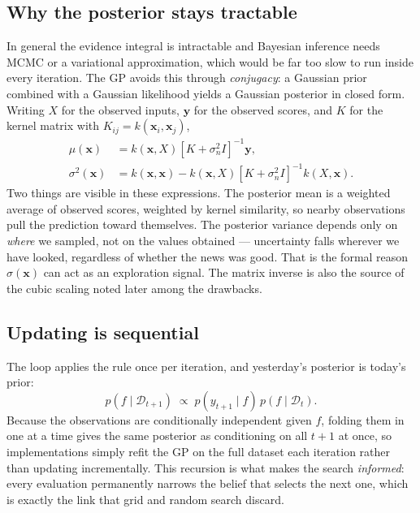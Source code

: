 \documentclass[conference]{IEEEtran}
\begin{document}
\subsection*{Why the posterior stays tractable}
In general the evidence integral is intractable and Bayesian inference needs MCMC or a variational approximation, which would be far too slow to run inside every iteration. The GP avoids this through \textit{conjugacy}: a Gaussian prior combined with a Gaussian likelihood yields a Gaussian posterior in closed form. Writing $X$ for the observed inputs, $\mathbf{y}$ for the observed scores, and $K$ for the kernel matrix with $K_{ij} = k(\mathbf{x}_i, \mathbf{x}_j)$,
\begin{align}
    \mu(\mathbf{x})      &= k(\mathbf{x}, X)\left[K + \sigma_n^2 I\right]^{-1}\mathbf{y}, \\
    \sigma^2(\mathbf{x}) &= k(\mathbf{x}, \mathbf{x}) - k(\mathbf{x}, X)\left[K + \sigma_n^2 I\right]^{-1}k(X, \mathbf{x}).
\end{align}
Two things are visible in these expressions. The posterior mean is a weighted average of observed scores, weighted by kernel similarity, so nearby observations pull the prediction toward themselves. The posterior variance depends only on \textit{where} we sampled, not on the values obtained --- uncertainty falls wherever we have looked, regardless of whether the news was good. That is the formal reason $\sigma(\mathbf{x})$ can act as an exploration signal. The matrix inverse is also the source of the cubic scaling noted later among the drawbacks.

\subsection*{Updating is sequential}
The loop applies the rule once per iteration, and yesterday's posterior is today's prior:
\begin{equation}
    p(f \mid \mathcal{D}_{t+1}) \;\propto\; p(y_{t+1} \mid f)\, p(f \mid \mathcal{D}_t).
\end{equation}
Because the observations are conditionally independent given $f$, folding them in one at a time gives the same posterior as conditioning on all $t+1$ at once, so implementations simply refit the GP on the full dataset each iteration rather than updating incrementally. This recursion is what makes the search \textit{informed}: every evaluation permanently narrows the belief that selects the next one, which is exactly the link that grid and random search discard.
\end{document}
